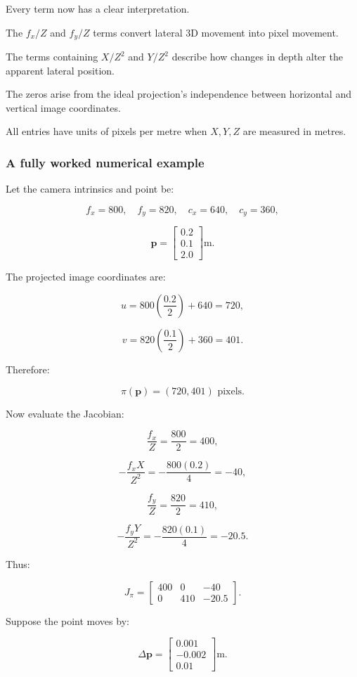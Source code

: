Every term now has a clear interpretation.

The \(f_x/Z\) and \(f_y/Z\) terms convert lateral 3D movement into pixel movement.

The terms containing \(X/Z^2\) and \(Y/Z^2\) describe how changes in depth alter the apparent lateral position.

The zeros arise from the ideal projection's independence between horizontal and vertical image coordinates.

All entries have units of pixels per metre when \(X,Y,Z\) are measured in metres.

\subsubsection{A fully worked numerical example}\label{02-foundations-ii-ch021-a-fully-worked-numerical-example}

Let the camera intrinsics and point be:

\[
f_x=800,\quad f_y=820, \quad c_x=640,\quad c_y=360,
\]

\[
\mathbf p= \begin{bmatrix} 0.2\\0.1\\2.0 \end{bmatrix}\mathrm{m}.
\]

The projected image coordinates are:

\[
u=800\left(\frac{0.2}{2}\right)+640=720,
\]

\[
v=820\left(\frac{0.1}{2}\right)+360=401.
\]

Therefore:

\[
\boxed{\pi(\mathbf p)=(720,401)\text{ pixels}}.
\]

Now evaluate the Jacobian:

\[
\frac{f_x}{Z}=\frac{800}{2}=400,
\]

\[
-\frac{f_xX}{Z^2} =-\frac{800(0.2)}{4}=-40,
\]

\[
\frac{f_y}{Z}=\frac{820}{2}=410,
\]

\[
-\frac{f_yY}{Z^2} =-\frac{820(0.1)}4=-20.5.
\]

Thus:

\[
\boxed{ J_\pi= \begin{bmatrix} 400&0&-40\\ 0&410&-20.5 \end{bmatrix} }.
\]

Suppose the point moves by:

\[
\Delta\mathbf p= \begin{bmatrix} 0.001\\ -0.002\\ 0.01 \end{bmatrix}\mathrm m.
\]

